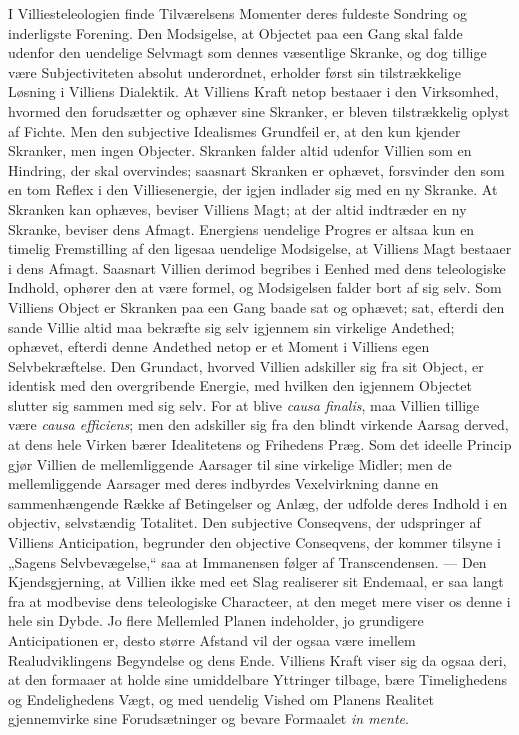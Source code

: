 \documentclass[12pt]{book}
\newcommand{\opage}[1]{\marginnote{\footnotesize\textit{[#1]}}}
\begin{document}
I Villiesteleologien finde Tilværelsens Momenter deres fuldeste
Sondring og inderligste Forening. Den Modsigelse, at Objectet paa
een Gang skal falde udenfor den uendelige Selvmagt som dennes
væsentlige Skranke, og dog tillige være Subjectiviteten absolut
underordnet, erholder først sin tilstrækkelige Løsning i Villiens
Dialektik. At Villiens Kraft netop bestaaer i den Virksomhed,
hvormed den forudsætter og ophæver sine Skranker, er bleven
tilstrækkelig oplyst af Fichte. Men den subjective Idealismes
Grundfeil er, at den kun kjender Skranker, men ingen Objecter.
Skranken falder altid udenfor Villien som en Hindring, der skal
overvindes; saasnart Skranken er ophævet, forsvinder den som en tom
Reflex i den Villiesenergie, der igjen indlader sig med en ny
Skranke. At Skranken kan ophæves, beviser Villiens Magt; at der
altid indtræder en ny Skranke, beviser dens Afmagt. Energiens
uendelige Progres er altsaa kun en timelig Fremstilling af den
ligesaa uendelige Modsigelse, at Villiens Magt bestaaer i dens
Afmagt. Saasnart Villien derimod begribes
\opage{237} i Eenhed med dens teleologiske Indhold, ophører den at være formel,
og Modsigelsen falder bort af sig selv. Som Villiens Object er
Skranken paa een Gang baade sat og ophævet; sat, efterdi den sande
Villie altid maa bekræfte sig selv igjennem sin virkelige
Andethed; ophævet, efterdi denne Andethed netop er et Moment i
Villiens egen Selvbekræftelse. Den Grundact, hvorved Villien
adskiller sig fra sit Object, er identisk med den overgribende
Energie, med hvilken den igjennem Objectet slutter sig sammen med
sig selv. For at blive \textit{causa finalis}, maa Villien tillige
være \textit{causa efficiens}; men den adskiller sig fra den blindt
virkende Aarsag derved, at dens hele Virken bærer Idealitetens og
Frihedens Præg. Som det ideelle Princip gjør Villien de
mellemliggende Aarsager til sine virkelige Midler; men de
mellemliggende Aarsager med deres indbyrdes Vexelvirkning danne en
sammenhængende Række af Betingelser og Anlæg, der udfolde deres
Indhold i en objectiv, selvstændig Totalitet. Den subjective
Conseqvens, der udspringer af Villiens Anticipation, begrunder den
objective Conseqvens, der kommer tilsyne i „Sagens Selvbevægelse,“
saa at Immanensen følger af Transcendensen. --- Den Kjendsgjerning,
at Villien ikke med eet Slag realiserer sit Endemaal, er saa langt
fra at modbevise dens teleologiske Characteer, at den meget mere
viser os denne i hele sin Dybde. Jo flere Mellemled Planen
indeholder, jo grundigere Anticipationen er, desto større Afstand
vil der ogsaa være imellem Realudviklingens Begyndelse og dens
Ende. Villiens Kraft viser sig da ogsaa deri, at den formaaer at
holde sine umiddelbare Yttringer tilbage, bære Timelighedens og
Endelighedens Vægt, og med uendelig Vished om Planens Realitet
gjennemvirke sine Forudsætninger og bevare Formaalet
\textit{in mente}.
\end{document}
